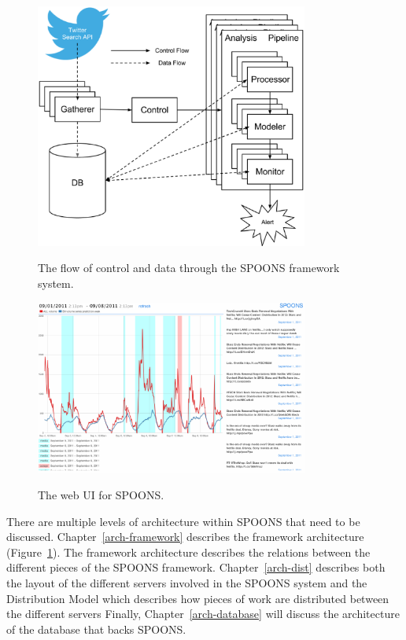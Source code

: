 \documentclass[12pt]{ucthesis}
\newcommand{\captionfonts}{\small\bf\ssp}
\begin{document}
\begin{figure}
   \begin{center}
      \includegraphics[width=0.8\textwidth]{images/SPOONS_Framework_Architecture.eps}
      \captionfonts
      \caption[SPOONS Framework Architecture]{The flow of control and data through the SPOONS framework system.}
      \label{fig:frameworkArch}
   \end{center}
\end{figure}

\begin{figure}
   \begin{center}
      \includegraphics[width=0.8\textwidth]{images/ui.eps}
      \captionfonts
      \caption[SPOONS UI]{The web UI for SPOONS.}
      \label{fig:ui}
   \end{center}
\end{figure}

There are multiple levels of architecture within SPOONS that need to be discussed.
Chapter~\ref{arch-framework} describes the framework architecture (Figure~\ref{fig:frameworkArch}).
The framework architecture describes the relations between the different pieces of the SPOONS framework.
Chapter~\ref{arch-dist} describes both the layout of the different servers involved in the SPOONS system
and the Distribution Model which describes how pieces of work are distributed between the different servers
Finally, Chapter~\ref{arch-database} will discuss the architecture of the database that backs SPOONS.
\end{document}
